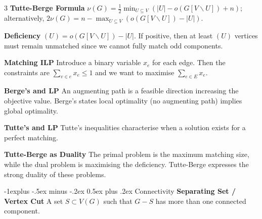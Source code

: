 \documentclass[10pt, landscape]{article}
\makeatletter
\renewcommand{\section}{\@startsection{section}{1}{0mm}%
                                {-1ex plus -.5ex minus -.2ex}%
                                {0.5ex plus .2ex}%
                                {\normalfont\large\bfseries}}
\renewcommand{\section}{\@startsection{section}{2}{0mm}%
                                {-1explus -.5ex minus -.2ex}%
                                {0.5ex plus .2ex}%
                                {\normalfont\normalsize\bfseries}}
\makeatother
\begin{document}
\begin{multicols*}{3}
\textbf{Tutte-Berge Formula} $\nu(G)=\frac{1}{2}\min_{U \subseteq V}(|U|-o(G[V \backslash U])+n)$; alternatively, $2\nu(G)=n-\max_{U \subseteq V}(o(G[V \backslash U])-|U|)$.

\textbf{Deficiency} $(U)=o(G[V \backslash U])-|U|$. If positive, then at least $(U)$ vertices must remain unmatched since we cannot fully match odd components.

\textbf{Matching ILP} Introduce a binary variable $x_e$ for each edge. Then the constraints are $\sum_{v \in e}x_e \leq 1$ and we want to maximise $\sum_{e \in E} x_e$.

\textbf{Berge's and LP} An augmenting path is a feasible direction increasing the objective value. Berge's states local optimality (no augmenting path) implies global optimality.

\textbf{Tutte's and LP} Tutte's inequalities characterise when a solution exists for a perfect matching.

\textbf{Tutte-Berge as Duality} The primal problem is the maximum matching size, while the dual problem is maximising the deficiency. Tutte-Berge expresses the strong duality of these problems.



\section{Connectivity}
\textbf{Separating Set / Vertex Cut} A set $S \subset V(G)$ such that $G-S$ has more than one connected component.


\end{multicols*}
\end{document}
